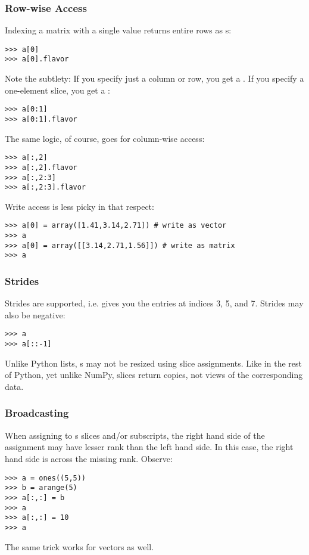 \subsubsection{Row-wise Access}
Indexing a matrix with a single value returns entire rows as s:
\begin{verbatim}
>>> a[0]
>>> a[0].flavor
\end{verbatim}
Note the subtlety: If you specify just a column or row, you get a
.  If you specify a one-element slice, you get a :
\begin{verbatim}
>>> a[0:1]
>>> a[0:1].flavor
\end{verbatim}
The same logic, of course, goes for column-wise access:
\begin{verbatim}
>>> a[:,2]
>>> a[:,2].flavor
>>> a[:,2:3]
>>> a[:,2:3].flavor
\end{verbatim}
Write access is less picky in that respect:
\begin{verbatim}
>>> a[0] = array([1.41,3.14,2.71]) # write as vector
>>> a
>>> a[0] = array([[3.14,2.71,1.56]]) # write as matrix
>>> a
\end{verbatim}
\subsubsection{Strides}
Strides are supported, i.e.  gives you the entries at indices
3, 5, and 7. Strides may also be negative:
\begin{verbatim}
>>> a
>>> a[::-1]
\end{verbatim}
Unlike Python lists, s may not be resized using slice assignments.
Like in the rest of Python, yet unlike NumPy, slices return copies, not views
of the corresponding data.
\subsubsection{Broadcasting}
\label{sssec:write-broadcasting}
When assigning to s slices and/or subscripts, the right hand
side of the assignment may have lesser rank than the left hand side. In this
case, the right hand side is  across the missing
rank. Observe:
\begin{verbatim}
>>> a = ones((5,5))
>>> b = arange(5)
>>> a[:,:] = b
>>> a
>>> a[:,:] = 10
>>> a
\end{verbatim}
The same trick works for vectors as well.
